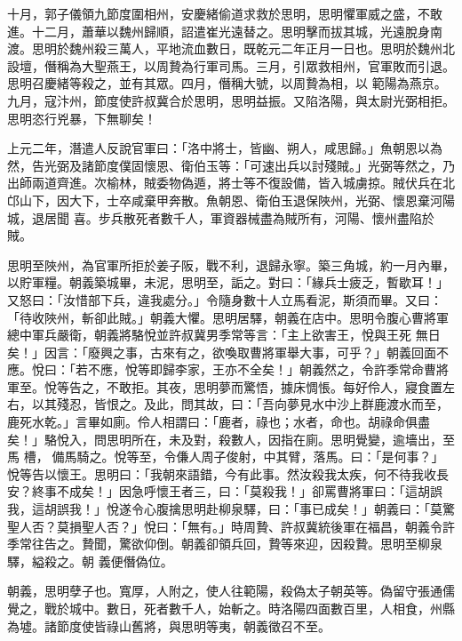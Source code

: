 \begin{pinyinscope}
 十月，郭子儀領九節度圍相州，安慶緒偷道求救於思明，思明懼軍威之盛，不敢進。十二月，蕭華以魏州歸順，詔遣崔光遠替之。思明擊而拔其城，光遠脫身南渡。思明於魏州殺三萬人，平地流血數日，既乾元二年正月一日也。思明於魏州北設壇，僭稱為大聖燕王，以周贄為行軍司馬。三月，引眾救相州，官軍敗而引退。思明召慶緒等殺之，並有其眾。四月，僭稱大號，以周贄為相，以
 範陽為燕京。九月，寇汴州，節度使許叔冀合於思明，思明益振。又陷洛陽，與太尉光弼相拒。思明恣行兇暴，下無聊矣！



 上元二年，潛遣人反說官軍曰：「洛中將士，皆幽、朔人，咸思歸。」魚朝恩以為然，告光弼及諸節度僕固懷恩、衛伯玉等：「可速出兵以討殘賊。」光弼等然之，乃出師兩道齊進。次榆林，賊委物偽遁，將士等不復設備，皆入城虜掠。賊伏兵在北邙山下，因大下，士卒咸棄甲奔散。魚朝恩、衛伯玉退保陜州，光弼、懷恩棄河陽城，退居聞
 喜。步兵散死者數千人，軍資器械盡為賊所有，河陽、懷州盡陷於賊。



 思明至陜州，為官軍所拒於姜子阪，戰不利，退歸永寧。築三角城，約一月內畢，以貯軍糧。朝義築城畢，未泥，思明至，詬之。對曰：「緣兵士疲乏，暫歇耳！」又怒曰：「汝惜部下兵，違我處分。」令隨身數十人立馬看泥，斯須而畢。又曰：「待收陜州，斬卻此賊。」朝義大懼。思明居驛，朝義在店中。思明令腹心曹將軍總中軍兵嚴衛，朝義將駱悅並許叔冀男季常等言：「主上欲害王，悅與王死
 無日矣！」因言：「廢興之事，古來有之，欲喚取曹將軍舉大事，可乎？」朝義回面不應。悅曰：「若不應，悅等即歸李家，王亦不全矣！」朝義然之，令許季常命曹將軍至。悅等告之，不敢拒。其夜，思明夢而驚悟，據床惆悵。每好伶人，寢食置左右，以其殘忍，皆恨之。及此，問其故，曰：「吾向夢見水中沙上群鹿渡水而至，鹿死水乾。」言畢如廁。伶人相謂曰：「鹿者，祿也；水者，命也。胡祿命俱盡矣！」駱悅入，問思明所在，未及對，殺數人，因指在廁。思明覺變，逾墻出，至馬
 槽，備馬騎之。悅等至，令傔人周子俊射，中其臂，落馬。曰：「是何事？」悅等告以懷王。思明曰：「我朝來語錯，今有此事。然汝殺我太疾，何不待我收長安？終事不成矣！」因急呼懷王者三，曰：「莫殺我！」卻罵曹將軍曰：「這胡誤我，這胡誤我！」悅遂令心腹擒思明赴柳泉驛，曰：「事已成矣！」朝義曰：「莫驚聖人否？莫損聖人否？」悅曰：「無有。」時周贄、許叔冀統後軍在福昌，朝義令許季常往告之。贄聞，驚欲仰倒。朝義卻領兵回，贄等來迎，因殺贄。思明至柳泉驛，縊殺之。朝
 義便僭偽位。



 朝義，思明孽子也。寬厚，人附之，使人往範陽，殺偽太子朝英等。偽留守張通儒覺之，戰於城中。數日，死者數千人，始斬之。時洛陽四面數百里，人相食，州縣為墟。諸節度使皆祿山舊將，與思明等夷，朝義徵召不至。




\end{pinyinscope}
